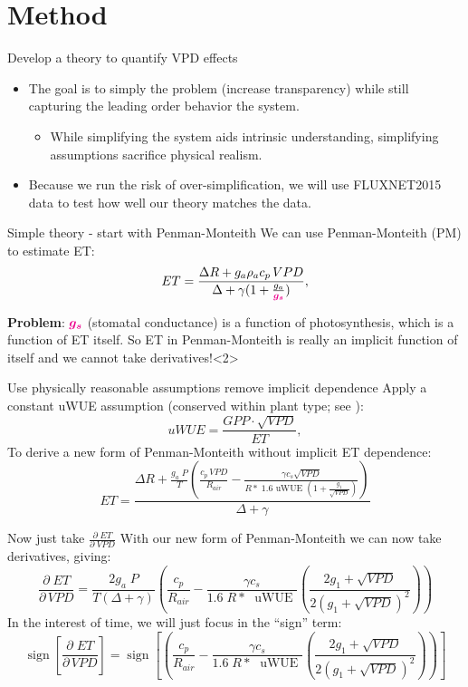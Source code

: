 \documentclass[aspectratio=169]{beamer}
\DeclareMathOperator{\sign}{sign}
\begin{document}
\section{Method}
\begin{frame}{Develop a theory to quantify VPD effects}
  \begin{itemize}
  \item The goal is to simply the problem (increase transparency) while still capturing the leading order behavior the system.
    \begin{itemize}
    \item While simplifying the system aids intrinsic understanding, simplifying assumptions sacrifice physical realism.
    \end{itemize}
  \item Because we run the risk of over-simplification, we will use FLUXNET2015 data to test how well our theory matches the data. 
  \end{itemize}
\end{frame}

\begin{frame}{Simple theory - start with Penman-Monteith}
  We can use Penman-Monteith (PM) to estimate ET:
  \[ET = \frac{\Delta R + g_a \rho_a c_p \, VPD}{\Delta + \gamma(1 + \frac{g_a}{\textcolor{magenta}{\boldsymbol{g_s}}})},\]
  \begin{overprint}
    \textbf{Problem}: \Large $\textcolor{magenta}{\boldsymbol{g_s}}$ \normalsize (stomatal conductance) is a function of photosynthesis, which is a function of ET itself.  So ET in Penman-Monteith is really an implicit function of itself and we cannot take derivatives!<2>
  \end{overprint}
\end{frame}

\begin{frame}{Use physically reasonable assumptions remove implicit dependence}
  Apply a constant uWUE assumption (conserved within plant type; see \cite{Zhou_2016}):
  \[uWUE = \frac{GPP \cdot \sqrt{VPD}}{ET},\]
  To derive a new form of Penman-Monteith without implicit ET dependence:
  \[  ET = \frac{\Delta R + \frac{g_a\; P}{T} \left( \frac{ c_p \, VPD}{R_{air}} -  \frac{\gamma c_s \sqrt{VPD} }{ R* \; 1.6 \text{ uWUE } (1 + \frac{g_1}{\sqrt{VPD}})} \right)}{ \Delta + \gamma}\]
\end{frame}

\begin{frame}{Now just take $\frac{\partial \; ET}{\partial \; VPD}$}
  With our new form of Penman-Monteith we can now take derivatives, giving:
  \[\frac{\partial \;  ET}{\partial \, VPD} = \frac{2 g_a \; P}{T(\Delta + \gamma)}   \left(\frac{ c_p}{R_{air}} - \frac{\gamma c_s }{1.6 \; R*\; \text{ uWUE }} \left( \frac{2 g_1 + \sqrt{VPD}}{2 (g_1 + \sqrt{VPD})^2}\right) \right)\]
  In the interest of time, we will just focus in the ``sign'' term:
  \[\sign \left[\frac{\partial \;  ET}{\partial \, VPD}\right] = \sign \left[  \left(\frac{ c_p}{R_{air}} - \frac{\gamma c_s }{1.6 \; R*\; \text{ uWUE }} \left( \frac{2 g_1 + \sqrt{VPD}}{2 (g_1 + \sqrt{VPD})^2}\right) \right) \right] \]

\end{frame}
\end{document}
